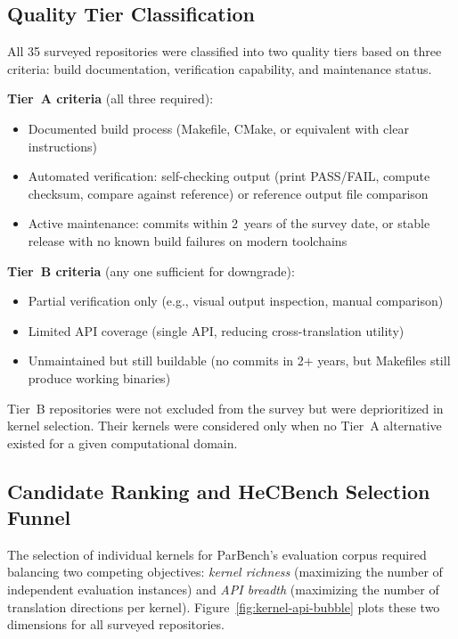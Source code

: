 \subsection{Quality Tier Classification}
\label{sec:appendix-b2}

All 35 surveyed repositories were classified into two quality tiers based on
three criteria: build documentation, verification capability, and maintenance
status.

\textbf{Tier~A criteria} (all three required):
\begin{itemize}
  \item Documented build process (Makefile, CMake, or equivalent with clear
    instructions)
  \item Automated verification: self-checking output (print PASS/FAIL, compute
    checksum, compare against reference) or reference output file comparison
  \item Active maintenance: commits within 2~years of the survey date, or stable
    release with no known build failures on modern toolchains
\end{itemize}

\textbf{Tier~B criteria} (any one sufficient for downgrade):
\begin{itemize}
  \item Partial verification only (e.g., visual output inspection, manual
    comparison)
  \item Limited API coverage (single API, reducing cross-translation utility)
  \item Unmaintained but still buildable (no commits in 2+ years, but Makefiles
    still produce working binaries)
\end{itemize}

Tier~B repositories were not excluded from the survey but were deprioritized in
kernel selection. Their kernels were considered only when no Tier~A alternative
existed for a given computational domain.

\subsection{Candidate Ranking and HeCBench Selection Funnel}
\label{sec:appendix-b3}

The selection of individual kernels for ParBench's evaluation corpus required
balancing two competing objectives: \emph{kernel richness} (maximizing the
number of independent evaluation instances) and \emph{API breadth} (maximizing
the number of translation directions per kernel). Figure~\ref{fig:kernel-api-bubble}
plots these two dimensions for all surveyed repositories.

